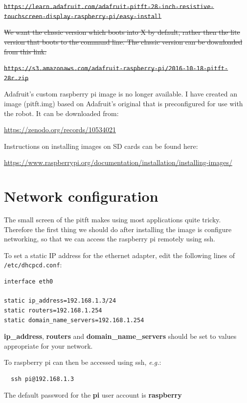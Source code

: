 \documentclass[
]{book}
\begin{document}
\st{\mbox{\texttt{https://learn.adafruit.com/adafruit-pitft-28-inch-resistive-touchscreen-display-raspberry-pi/easy-install}}}

\st{We want the classic version which boots into X by default, rather then the lite version that boots to the command line. The classic version can be downloaded from this link:}

\st{\mbox{\texttt{https://s3.amazonaws.com/adafruit-raspberry-pi/2016-10-18-pitft-28r.zip}}}

Adafruit's custom raspberry pi image is no longer available. I have created an image (pitft.img) based on Adafruit's original that is preconfigured for use with the robot. It can be downloaded from:

\url{https://zenodo.org/records/10534021}

Instructions on installing images on SD cards can be found here:

\url{https://www.raspberrypi.org/documentation/installation/installing-images/}

\hypertarget{network-configuration}{%
\section{Network configuration}\label{network-configuration}}

The small screen of the pitft makes using most applications quite tricky. Therefore the first thing we should do after installing the image is configure networking, so that we can access the raspberry pi remotely using ssh.

To set a static IP address for the ethernet adapter, edit the following lines of \texttt{/etc/dhcpcd.conf}:

\begin{verbatim}
interface eth0

static ip_address=192.168.1.3/24
static routers=192.168.1.254
static domain_name_servers=192.168.1.254
\end{verbatim}

\textbf{ip\_address}, \textbf{routers} and \textbf{domain\_name\_servers} should be set to values appropriate for your network.

To raspberry pi can then be accessed using ssh, \emph{e.g.}:

\begin{verbatim}
  ssh pi@192.168.1.3
\end{verbatim}

The default password for the \textbf{pi} user account is \textbf{raspberry}
\end{document}
